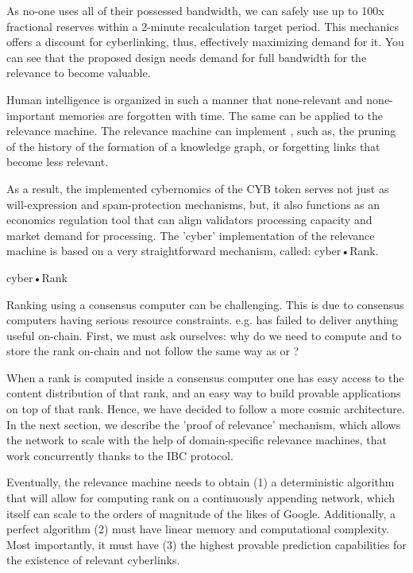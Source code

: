 \documentclass[8pt,oneside]{amsart}
\makeatletter
\newcommand{\linkgreen}[2]{\href{#1}{\color{green}{#2}}}
\renewcommand\subsection{\@startsection{subsection}
                                    {2}{\z@}
                                    {-3.25ex\@plus -1ex \@minus -.2ex}
                                    {0ex \@plus .2ex}
                                    {\play\Large}
                        }
\newcommand{\titleSection}[1]{\subsection{#1}}
\makeatother
\begin{document}
As no-one uses all of their possessed bandwidth, we can safely use up to 100x fractional reserves within a 2-minute recalculation target period. This mechanics offers a discount for cyberlinking, thus, effectively maximizing demand for it. You can see that the proposed design needs demand for full bandwidth for the relevance to become valuable.

Human intelligence is organized in such a manner that none-relevant and none-important memories are forgotten with time. The same can be applied to the relevance machine. The relevance machine can implement \linkgreen{https://ipfs.io/ipfs/QmP81EcuNDZHQutvdcDjbQEqiTYUzU315aYaTyrVj6gtJb}{aggressive pruning strategies}, such as, the pruning of the history of the formation of a knowledge graph, or forgetting links that become less relevant.

As a result, the implemented cybernomics of the CYB token serves not just as will-expression and spam-protection mechanisms, but, it also functions as an economics regulation tool that can align validators processing capacity and market demand for processing. The 'cyber' implementation of the relevance machine is based on a very straightforward mechanism, called: cyber•Rank.

\titleSection{cyber•Rank}\label{cyber-rank}

Ranking using a consensus computer can be challenging. This is due to consensus computers having serious resource constraints. e.g. \linkgreen{https://ipfs.io/ipfs/QmWTZjDZNbBqcJ5b6VhWGXBQ5EQavKKDteHsdoYqB5CBjh}{Nebulas} has failed to deliver anything useful on-chain. First, we must ask ourselves: why do we need to compute and to store the rank on-chain and not follow the same way as \linkgreen{https://ipfs.io/ipfs/QmZo7eY5UdJYotf3Z9GNVBGLjkCnE1j2fMdW2PgGCmvGPj}{Colony} or \linkgreen{https://ipfs.io/ipfs/QmTrxXp2xhB2zWGxhNoLgsztevqKLwpy5HwKjLjzFa7rnD}{Truebit}?

When a rank is computed inside a consensus computer one has easy access to the content distribution of that rank, and an easy way to build provable applications on top of that rank. Hence, we have decided to follow a more cosmic architecture. In the next section, we describe the 'proof of relevance' mechanism, which allows the network to scale with the help of domain-specific relevance machines, that work concurrently thanks to the IBC protocol.

Eventually, the relevance machine needs to obtain (1) a deterministic algorithm that will allow for computing rank on a continuously appending network, which itself can scale to the orders of magnitude of the likes of Google. Additionally, a perfect algorithm (2) must have linear memory and computational complexity. Most importantly, it must have (3) the highest provable prediction capabilities for the existence of relevant cyberlinks.
\end{document}
